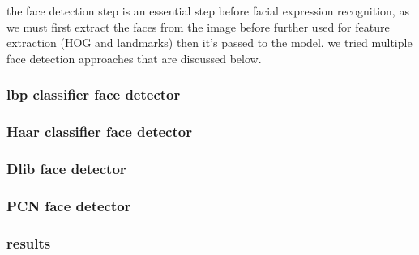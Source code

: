 the face detection step is an essential step before facial expression recognition, as we must first extract the faces from the image before further used for feature extraction (HOG and landmarks) then it's passed to the model.
\newline
we tried multiple face detection approaches that are discussed below.
\subsubsection{lbp classifier face detector}

\subsubsection{Haar classifier face detector}

\subsubsection{Dlib face detector}

\subsubsection{PCN face detector}

\subsubsection{results}